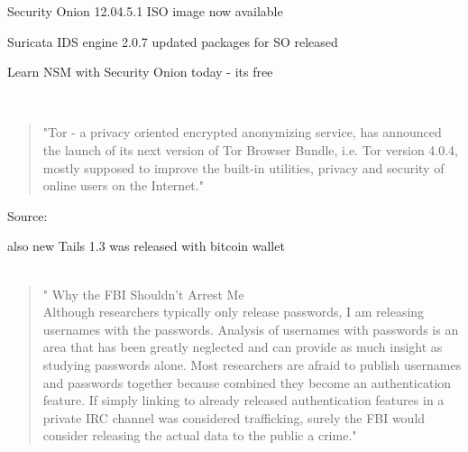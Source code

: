 \documentclass[20pt,landscape,a4paper,footrule]{foils}
\begin{document}

\begin{list2}
\item Security Onion 12.04.5.1 ISO image now available
\item Suricata IDS engine 2.0.7 updated packages for SO released
\item Learn NSM with Security Onion today - its free
\end{list2}
{\small{}\\
}




\begin{quote}
"Tor - a privacy oriented encrypted anonymizing service, has announced the launch of its next version of Tor Browser Bundle, i.e. Tor version 4.0.4, mostly supposed to improve the built-in utilities, privacy and security of online users on the Internet."
	\end{quote}


Source:
\\

also new Tails 1.3 was released with bitcoin wallet\\
\\





\begin{quote}
"  Why the FBI Shouldn't Arrest Me\\
  Although researchers typically only release passwords, I am releasing usernames with the passwords. Analysis of usernames with passwords is an area that has been greatly neglected and can provide as much insight as studying passwords alone. Most researchers are afraid to publish usernames and passwords together because combined they become an authentication feature. If simply linking to already released authentication features in a private IRC channel was considered trafficking, surely the FBI would consider releasing the actual data to the public a crime."
\end{quote}
\end{document}
